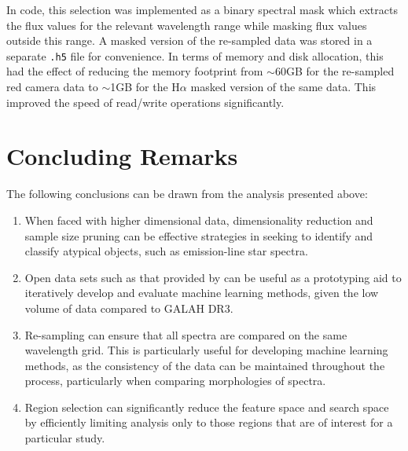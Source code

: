 In code, this selection was implemented as a binary spectral mask which extracts the flux values for the relevant wavelength range while masking flux values outside this range. A masked version of the re-sampled data was stored in a separate \texttt{.h5} file for convenience. In terms of memory and disk allocation, this had the effect of reducing the memory footprint from $\sim$60GB for the re-sampled red camera data to $\sim$1GB for the H$\alpha$ masked version of the same data. This improved the speed of read/write operations significantly. 

\section{Concluding Remarks}

The following conclusions can be drawn from the analysis presented above:

\begin{enumerate}
\item When faced with higher dimensional data, dimensionality reduction and sample size pruning can be effective strategies in seeking to identify and classify atypical objects, such as emission-line star spectra. 

\item Open data sets such as that provided by \citet{vcotar2021galah} can be useful as a prototyping aid to iteratively develop and evaluate machine learning methods, given the low volume of data compared to GALAH DR3. 

\item Re-sampling can ensure that all spectra are compared on the same wavelength grid. This is particularly useful for developing machine learning methods, as the consistency of the data can be maintained throughout the process, particularly when comparing morphologies of spectra.  

\item Region selection can significantly reduce the feature space and search space by efficiently limiting analysis only to those regions that are of interest for a particular study. 
\end{enumerate}

